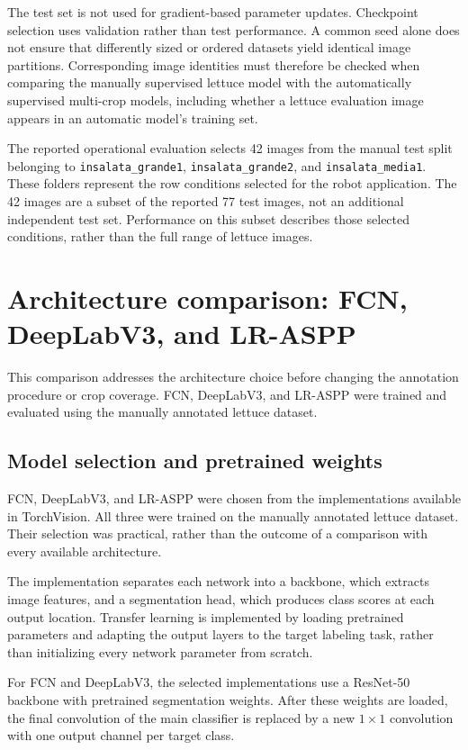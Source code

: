 The test set is not used for gradient-based parameter updates. Checkpoint
selection uses validation rather than test performance. A common seed
alone does not ensure that differently sized or ordered datasets yield
identical image partitions. Corresponding image identities must therefore
be checked when comparing the manually supervised lettuce model with the
automatically supervised multi-crop models, including whether a lettuce
evaluation image appears in an automatic model's training set.

The reported operational evaluation selects 42 images from the manual
test split belonging to \texttt{insalata\_grande1},
\texttt{insalata\_grande2}, and \texttt{insalata\_media1}. These folders
represent the row conditions selected for the robot application. The
42 images are a subset of the reported 77 test images, not an additional
independent test set. Performance on this subset describes those selected
conditions, rather than the full range of lettuce images.

\section{Architecture comparison: FCN, DeepLabV3, and LR-ASPP}
\label{sec:c4_architecture_comparison}

This comparison addresses the architecture choice before changing the
annotation procedure or crop coverage. FCN, DeepLabV3, and LR-ASPP were
trained and evaluated using the manually annotated lettuce dataset.

\subsection{Model selection and pretrained weights}
\label{subsec:c4_model_selection}

FCN, DeepLabV3, and LR-ASPP were chosen from the implementations available
in TorchVision. All three were trained on the manually annotated lettuce
dataset. Their selection was practical, rather than the outcome of a
comparison with every available architecture.

The implementation separates each network into a backbone, which extracts
image features, and a segmentation head, which produces class scores at
each output location. Transfer learning is implemented by loading
pretrained parameters and adapting the output layers to the target
labeling task, rather than initializing every network parameter from
scratch.

For FCN and DeepLabV3, the selected implementations use a ResNet-50
backbone with pretrained segmentation weights. After these weights
are loaded, the final convolution of the main classifier is replaced by
a new $1\times1$ convolution with one output channel per target class.

